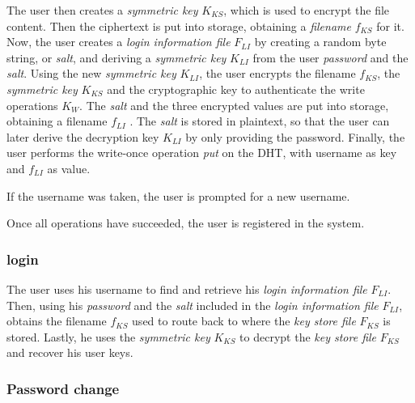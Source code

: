 The user then creates a \textit{symmetric key} $K_{KS}$, which is used to
encrypt the file content. Then the ciphertext
is put into storage, obtaining a \textit{filename} $f_{KS}$ for it. Now, the user
creates a \textit{login information file} $F_{LI}$ by creating a random
byte string, or \textit{salt}, and deriving a \textit{symmetric key} $K_{LI}$ from the user
\textit{password} and the \textit{salt}.
Using the new \textit{ symmetric key} $K_{LI}$, the user encrypts the
filename $f_{KS}$,
the \textit{symmetric key} $K_{KS}$ and the cryptographic key to
authenticate the write operations $K_W$.
 The \textit{salt} and the three encrypted values are put
into storage, obtaining a filename $f_{LI}$ . The \textit{salt} is stored
in plaintext, so that the user can later derive the decryption
key $K_{LI}$ by only providing the password. Finally, the user
performs the write-once operation \textit{put} on the DHT, with
username as key and $f_{LI}$ as value.

If the username was taken,
the user is prompted for a new username.

Once all operations
have succeeded, the user is registered in the system.


\subsubsection{login}


The user uses his username to find and retrieve his \textit{login information
file} $F_{LI}$. Then, using his \textit{password} and the \textit{salt} included in the
\textit{login information file} $F_{LI}$, obtains the filename
$f_{KS}$ used to
route back to where the \textit{key store file} $F_{KS}$ is stored.  Lastly, he uses the
\textit{symmetric key} $K_{KS}$ to decrypt the \textit{key store file}
$F_{KS}$ and recover his user keys.

\subsubsection{Password change}


